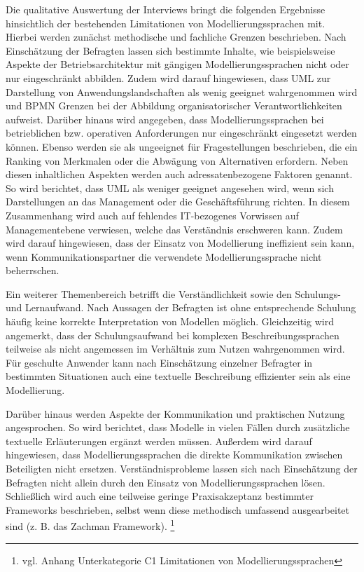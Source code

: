 Die qualitative Auswertung der Interviews bringt die folgenden Ergebnisse hinsichtlich der bestehenden Limitationen von Modellierungssprachen mit.
Hierbei werden zunächst methodische und fachliche Grenzen beschrieben. Nach Einschätzung der Befragten lassen sich bestimmte Inhalte, wie beispielsweise Aspekte der Betriebsarchitektur mit gängigen Modellierungssprachen nicht oder nur eingeschränkt abbilden. Zudem wird darauf hingewiesen, dass UML zur Darstellung von Anwendungslandschaften als wenig geeignet wahrgenommen wird und BPMN Grenzen bei der Abbildung organisatorischer Verantwortlichkeiten aufweist. Darüber hinaus wird angegeben, dass Modellierungssprachen bei betrieblichen bzw. operativen Anforderungen nur eingeschränkt eingesetzt werden können. Ebenso werden sie als ungeeignet für Fragestellungen beschrieben, die ein Ranking von Merkmalen oder die Abwägung von Alternativen erfordern.
Neben diesen inhaltlichen Aspekten werden auch adressatenbezogene Faktoren genannt. So wird berichtet, dass UML als weniger geeignet angesehen wird, wenn sich Darstellungen an das Management oder die Geschäftsführung richten. In diesem Zusammenhang wird auch auf fehlendes IT-bezogenes Vorwissen auf Managementebene verwiesen, welche das Verständnis erschweren kann. Zudem wird darauf hingewiesen, dass der Einsatz von Modellierung ineffizient sein kann, wenn Kommunikationspartner die verwendete Modellierungssprache nicht beherrschen.

Ein weiterer Themenbereich betrifft die Verständlichkeit sowie den Schulungs- und Lernaufwand. Nach Aussagen der Befragten ist ohne entsprechende Schulung häufig keine korrekte Interpretation von Modellen möglich. Gleichzeitig wird angemerkt, dass der Schulungsaufwand bei komplexen Beschreibungssprachen teilweise als nicht angemessen im Verhältnis zum Nutzen wahrgenommen wird. Für geschulte Anwender kann nach Einschätzung einzelner Befragter in bestimmten Situationen auch eine textuelle Beschreibung effizienter sein als eine Modellierung.

Darüber hinaus werden Aspekte der Kommunikation und praktischen Nutzung angesprochen. So wird berichtet, dass Modelle in vielen Fällen durch zusätzliche textuelle Erläuterungen ergänzt werden müssen. Außerdem wird darauf hingewiesen, dass Modellierungssprachen die direkte Kommunikation zwischen Beteiligten nicht ersetzen. Verständnisprobleme lassen sich nach Einschätzung der Befragten nicht allein durch den Einsatz von Modellierungssprachen lösen. Schließlich wird auch eine teilweise geringe Praxisakzeptanz bestimmter Frameworks beschrieben, selbst wenn diese methodisch umfassend ausgearbeitet sind (z. B. das Zachman Framework). \footnote{vgl. Anhang Unterkategorie C1 Limitationen von Modellierungssprachen}

